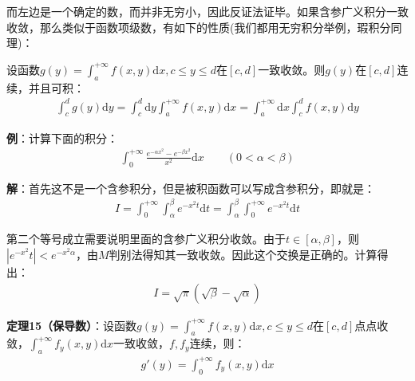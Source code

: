 \documentclass{ctexart}
\let\oldtextbf\textbf
\renewcommand{\textbf}[1]{\textcolor{brown!50!red}{\oldtextbf{#1}}}
\begin{document}
而左边是一个确定的数，而并非无穷小，因此反证法证毕。如果含参广义积分一致收敛，那么类似于函数项级数，有如下的性质(我们都用无穷积分举例，瑕积分同理)：
\begin{tcolorbox}[
    colback=bac2,     %
    colframe=fra2,   %
    coltitle=white,             %
    coltext=tex2,
    title=保连续与保积分,
    fonttitle=\bfseries,        %
arc=3mm,                     %
breakable
]
\textbf{\color{brown!50!red}{定理14（保连续与保积分）：}}设函数$g(y)=\int_a^{+\infty}f(x,y)\mathrm{d}x,c\leq y\leq d$在$[c,d]$一致收敛。则$g(y)$在$[c,d]$连续，并且可积：
\begin{align*}
    \int_c^d g(y)\mathrm{d}y=\int_c^d \mathrm{d}y\int_a^{+\infty}f(x,y)\mathrm{d}x=\int_a^{+\infty}\mathrm{d}x\int_c^df(x,y)\mathrm{d}y
\end{align*}
\end{tcolorbox}

\textbf{\color{brown!50!red}例}：计算下面的积分：
\begin{align*}
    \int_0^{+\infty}\frac{e^{-\alpha x^2}-e^{-\beta x^2}}{x^2}\mathrm{d}x\qquad (0<\alpha<\beta)
\end{align*}

\textbf{\color{brown!50!red}解}：首先这不是一个含参积分，但是被积函数可以写成含参积分，即就是：
\begin{align*}
I=\int_0^{+\infty}\int_{\alpha}^\beta e^{-x^2t}\mathrm{d}t =\int_\alpha^\beta\int_0^{+\infty}e^{-x^2 t}\mathrm{d}t
\end{align*}

第二个等号成立需要说明里面的含参广义积分收敛。由于$t\in[\alpha,\beta]$，则$|e^{-x^2}t|<e^{-x^2\alpha}$，由$M$判别法得知其一致收敛。因此这个交换是正确的。计算得出：
\begin{align*}
    I=\sqrt{\pi}(\sqrt{\beta}-\sqrt{\alpha})
\end{align*}
\begin{tcolorbox}[
    colback=bac2,     %
    colframe=fra2,   %
    coltitle=white,             %
    coltext=tex2,
    title=保导数,
    fonttitle=\bfseries,        %
    arc=3mm                     %
]
\textbf{\color{brown!50!red}定理15（保导数）}：设函数$g(y)=\int_a^{+\infty}f(x,y)\mathrm{d}x,c\leq y\leq d$在$[c,d]$点点收敛，$\int_a^{+\infty} f_y(x,y)\mathrm{d}x$一致收敛，$f,f_y$连续，则：
\begin{align*}
    g'(y)=\int_0^{+\infty}f_y(x,y)\mathrm{d}x
\end{align*}
\end{tcolorbox}
\end{document}
